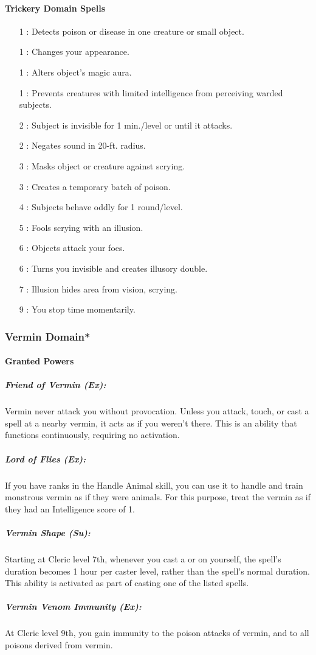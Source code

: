 \paragraph{Trickery Domain Spells}
\begin{itemize}
\item[1] : Detects poison or disease in one creature or small object.
\item[1] : Changes your appearance.
\item[1] : Alters object's magic aura.
\item[1] : Prevents creatures with limited intelligence from perceiving warded subjects.
\item[2] : Subject is invisible for 1 min./level or until it attacks.
\item[2] : Negates sound in 20-ft. radius.
\item[3] : Masks object or creature against scrying.
\item[3] : Creates a temporary batch of poison.
\item[4] : Subjects behave oddly for 1 round/level.
\item[5] : Fools scrying with an illusion.
\item[6] : Objects attack your foes.
\item[6]  : Turns you invisible and creates illusory double.
\item[7] : Illusion hides area from vision, scrying.
\item[9] : You stop time momentarily.
\end{itemize}
\subsubsection[Vermin Domain]{Vermin Domain*}
\label{Domain:Vermin}
\paragraph{Granted Powers}
\subparagraph{Friend of Vermin (Ex):}
Vermin never attack you without provocation. Unless you attack, touch, or cast a spell at a nearby vermin, it acts as if you weren't there.
This is an ability that functions continuously, requiring no activation.
\subparagraph{Lord of Flies (Ex):}
If you have ranks in the Handle Animal skill, you can use it to handle and train monstrous vermin as if they were animals.
For this purpose, treat the vermin as if they had an Intelligence score of 1.
\subparagraph{Vermin Shape (Su):}
Starting at Cleric level 7th, whenever you cast a  or  on yourself, 
the spell's duration becomes 1 hour per caster level, rather than the spell's normal duration.
This ability is activated as part of casting one of the listed spells.
\subparagraph{Vermin Venom Immunity (Ex):}
At Cleric level 9th, you gain immunity to the poison attacks of vermin, and to all poisons derived from vermin.
